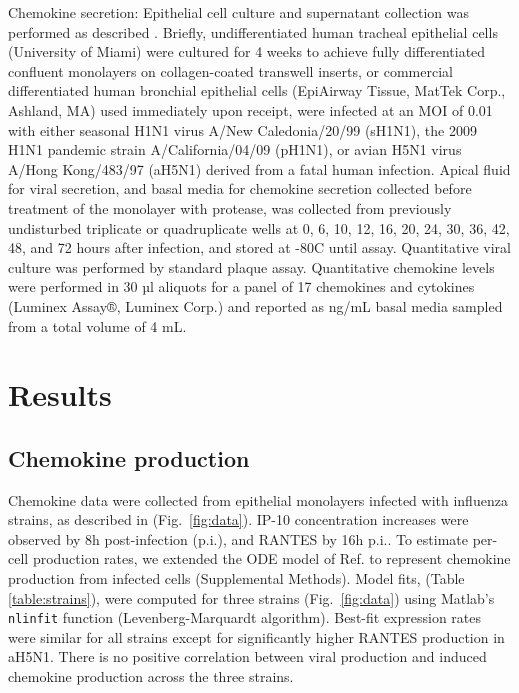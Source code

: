 \documentclass[10pt]{article}
\begin{document}
Chemokine secretion:  Epithelial cell culture and supernatant collection was performed as described \cite{Mitchell2011}.  Briefly, undifferentiated human tracheal epithelial cells (University of Miami) were cultured for 4 weeks to achieve fully differentiated confluent monolayers on collagen-coated transwell inserts, or commercial differentiated human bronchial epithelial cells (EpiAirway Tissue, MatTek Corp., Ashland, MA) used immediately upon receipt, were infected at an MOI of 0.01 with either seasonal H1N1 virus A/New Caledonia/20/99 (sH1N1), the 2009 H1N1 pandemic strain A/California/04/09 (pH1N1), or avian H5N1 virus A/Hong Kong/483/97 (aH5N1) derived from a fatal human infection.  Apical fluid for viral secretion, and basal media for chemokine secretion collected before treatment of the monolayer with protease, was collected from previously undisturbed triplicate or quadruplicate wells at 0, 6, 10, 12, 16, 20, 24, 30, 36, 42, 48, and 72 hours after infection, and stored at -80C until assay.  Quantitative viral culture was performed by standard plaque assay.  Quantitative chemokine levels were performed in 30 µl aliquots for a panel of 17 chemokines and cytokines (Luminex Assay®, Luminex Corp.) and reported as ng/mL basal media sampled from a total volume of 4 mL.

\section*{Results}

\subsection*{Chemokine production}

Chemokine data were collected from epithelial monolayers infected with influenza strains, as described in \cite{Mitchell2011} (Fig.~\ref{fig:data}).  IP-10 concentration increases were observed by 8h post-infection (p.i.), and RANTES by 16h p.i..  To estimate per-cell production rates, we extended the ODE model of Ref. \cite{Mitchell2011} to represent chemokine production from infected cells (Supplemental Methods).  Model fits, (Table \ref{table:strains}), were computed for three strains (Fig.~\ref{fig:data}) using Matlab's \texttt{nlinfit} function (Levenberg-Marquardt algorithm).  Best-fit expression rates were similar for all strains except for significantly higher RANTES production in aH5N1.  There is no positive correlation between viral production and induced chemokine production across the three strains.
\end{document}
